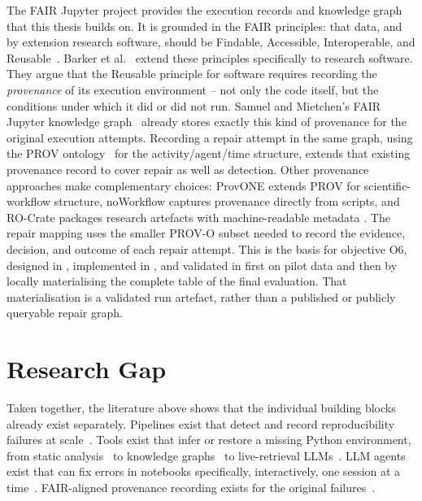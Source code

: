The FAIR Jupyter project provides the execution records and knowledge graph
that this thesis builds on. It is grounded in the FAIR principles: that data,
and by extension research software, should be Findable, Accessible,
Interoperable, and Reusable~\cite{wilkinson2016fair}. Barker et al.~\cite{barker2022fair4rs}
extend these principles specifically to research software. They argue
that the Reusable principle for software requires recording the
\emph{provenance} of its execution environment -- not only the code
itself, but the conditions under which it did or did not run. Samuel
and Mietchen's FAIR Jupyter knowledge
graph~\cite{samuel2024fairkg,samuel2024zenodo} already stores exactly
this kind of provenance for the original execution attempts. Recording
a repair attempt in the same graph, using the PROV
ontology~\cite{provenance2013} for the activity/agent/time structure,
extends that existing provenance record to cover repair as well as
detection. Other provenance approaches make complementary choices: ProvONE
extends PROV for scientific-workflow structure, noWorkflow captures
provenance directly from scripts, and RO-Crate packages research artefacts
with machine-readable metadata
\cite{provone2016,noworkflow2014,rocrate2022}. The repair mapping uses the
smaller PROV-O subset needed to record the evidence, decision, and outcome of
each repair attempt. This is the basis for objective O6, designed in
, implemented in , and
validated in  first on pilot data and then by locally
materialising the complete table of the final evaluation. That materialisation
is a validated run artefact, rather than a published or publicly queryable
repair graph.

\section{Research Gap}
\label{sec:rw-gap}

Taken together, the literature above shows that the individual building
blocks already exist separately. Pipelines exist that detect and record
reproducibility failures at
scale~\cite{samuel2025docker,samuel2024gigascience,samuel2024fairkg}. Tools
exist that infer or restore a missing Python
environment, from static analysis~\cite{wang2021snifferdog} to
knowledge graphs~\cite{horton2019dockerizeme,ye2022pyego,cheng2022pycre,cheng2024readpye}
to live-retrieval LLMs~\cite{bartlett2025pllm}. LLM agents exist that can fix
errors in notebooks specifically, interactively, one session at a
time~\cite{grotov2024untangling,grotov2024debug}. FAIR-aligned provenance
recording exists for the original failures~\cite{samuel2024fairkg}.

